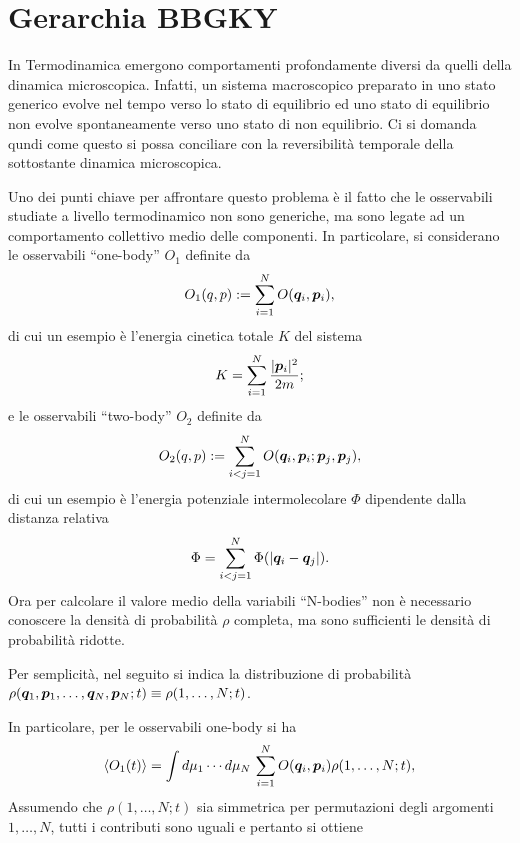 \section{Gerarchia BBGKY}
In Termodinamica emergono comportamenti profondamente diversi da quelli della dinamica microscopica. Infatti, un sistema macroscopico preparato in uno stato generico evolve nel tempo verso lo stato di equilibrio ed uno stato di equilibrio non evolve spontaneamente verso uno stato di non equilibrio. Ci si domanda qundi come questo si possa conciliare con la reversibilità temporale della sottostante dinamica microscopica. 

Uno dei punti chiave per affrontare questo problema è il fatto che le osservabili studiate a livello termodinamico non sono generiche, ma sono legate ad un comportamento collettivo medio delle componenti. In particolare, si considerano le osservabili ``one-body'' $O_1$ definite da
\begin{equation}
\label{eq: definizione osservabili one-body}
    O_1(q,p) := \sum_{i=1}^NO(\bm{q}_i,\bm{p}_i),
\end{equation}
di cui un esempio è l'energia cinetica totale $K$ del sistema
\begin{equation}
    K = \sum_{i=1}^N\frac{|\bm{p}_i|^2}{2m};
\end{equation}
e le osservabili ``two-body'' $O_2$ definite da 
\begin{equation}
\label{eq: definizione osservabili two-body}
    O_2(q,p) := \sum_{i<j=1}^NO(\bm{q}_i,\bm{p}_i;\bm{p}_j,\bm{p}_j),
\end{equation}
di cui un esempio è l'energia potenziale intermolecolare $\Phi$ dipendente dalla distanza relativa
\begin{equation}
    \Phi = \sum_{i<j=1}^N\Phi(|\bm{q}_i - \bm{q}_j|).
\end{equation}
Ora per calcolare il valore medio della variabili ``N-bodies'' non è necessario conoscere la densità di probabilità $\rho$ completa, ma sono sufficienti le densità di probabilità ridotte. 
\begin{notz}
    Per semplicità, nel seguito si indica la distribuzione di probabilità $\rho(\bm{q}_1,\bm{p}_1,\dots,\bm{q}_N,\bm{p}_N;t) \equiv \rho(1,\dots,N;t)$.
\end{notz}
In particolare, per le osservabili one-body si ha
\begin{equation}
    \langle O_1(t) \rangle = \int d\mu_1\cdots d\mu_N\,\sum_{i=1}^NO(\bm{q}_i,\bm{p}_i)\rho(1,\dots,N;t),
\end{equation}
Assumendo che $\rho(1,\dots,N;t)$ sia simmetrica per permutazioni degli argomenti $1,\dots,N$, tutti i contributi sono uguali e pertanto si ottiene
